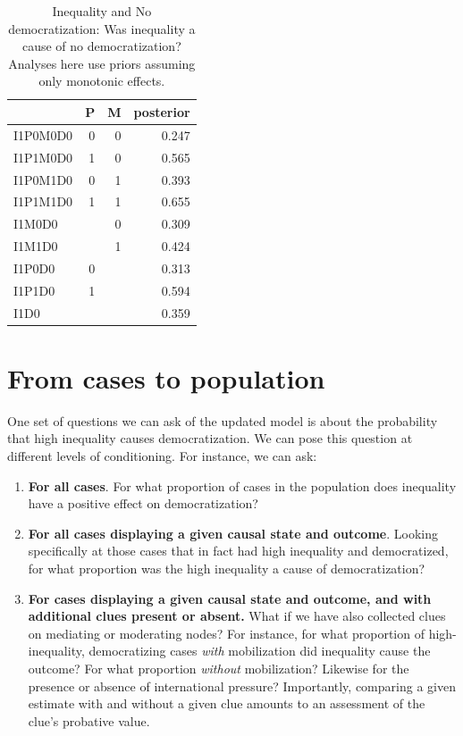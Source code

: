 \documentclass[
  12pt,
]{book}
\begin{document}
\begin{table}

\caption{\label{tab:Tapp102}Inequality and No democratization: Was inequality a cause of no democratization? Analyses here use priors assuming only monotonic effects.}
\centering
\begin{tabular}[t]{l|r|r|r}
\hline
  & P & M & posterior\\
\hline
I1P0M0D0 & 0 & 0 & 0.247\\
\hline
I1P1M0D0 & 1 & 0 & 0.565\\
\hline
I1P0M1D0 & 0 & 1 & 0.393\\
\hline
I1P1M1D0 & 1 & 1 & 0.655\\
\hline
I1M0D0 &  & 0 & 0.309\\
\hline
I1M1D0 &  & 1 & 0.424\\
\hline
I1P0D0 & 0 &  & 0.313\\
\hline
I1P1D0 & 1 &  & 0.594\\
\hline
I1D0 &  &  & 0.359\\
\hline
\end{tabular}
\end{table}

\hypertarget{from-cases-to-population}{%
\section{From cases to population}\label{from-cases-to-population}}

One set of questions we can ask of the updated model is about the probability that high inequality causes democratization. We can pose this question at different levels of conditioning. For instance, we can ask:

\begin{enumerate}
\def\labelenumi{\arabic{enumi}.}
\item
  \textbf{For all cases}. For what proportion of cases in the population does inequality have a positive effect on democratization?
\item
  \textbf{For all cases displaying a given causal state and outcome}. Looking specifically at those cases that in fact had high inequality and democratized, for what proportion was the high inequality a cause of democratization?
\item
  \textbf{For cases displaying a given causal state and outcome, and with additional clues present or absent.} What if we have also collected clues on mediating or moderating nodes? For instance, for what proportion of high-inequality, democratizing cases \emph{with} mobilization did inequality cause the outcome? For what proportion \emph{without} mobilization? Likewise for the presence or absence of international pressure? Importantly, comparing a given estimate with and without a given clue amounts to an assessment of the clue's probative value.
\end{enumerate}
\end{document}
